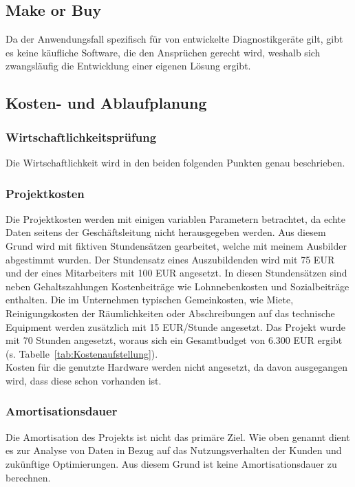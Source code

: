 \subsection{\glqq Make or Buy\grqq}
\label{sec:MakeOrBuy}
Da der Anwendungsfall spezifisch für von {\betriebNameKzf} entwickelte Diagnostikgeräte gilt, gibt es keine käufliche Software, die den Ansprüchen gerecht wird, weshalb sich zwangsläufig die Entwicklung einer eigenen Lösung ergibt.

\subsection{Kosten- und Ablaufplanung}
\label{sec:KostenAblaufPlanung}

\subsubsection{Wirtschaftlichkeitsprüfung}
\label{sec:Wirtschaftlichkeitspruefung}
Die Wirtschaftlichkeit wird in den beiden folgenden Punkten genau beschrieben.

\subsubsection{Projektkosten}
\label{sec:Projektkosten}
Die Projektkosten werden mit einigen variablen Parametern betrachtet, da echte Daten seitens der Geschäftsleitung nicht herausgegeben werden. Aus diesem Grund wird mit fiktiven Stundensätzen gearbeitet, welche mit meinem Ausbilder abgestimmt wurden. Der Stundensatz eines Auszubildenden wird mit 75 EUR und der eines Mitarbeiters mit 100 EUR angesetzt. In diesen Stundensätzen sind neben Gehaltszahlungen Kostenbeiträge  wie Lohnnebenkosten und Sozialbeiträge enthalten. Die im Unternehmen typischen Gemeinkosten, wie Miete, Reinigungskosten der Räumlichkeiten oder Abschreibungen auf das technische Equipment werden zusätzlich mit 15 EUR/Stunde angesetzt. Das Projekt wurde mit 70 Stunden angesetzt, woraus sich ein Gesamtbudget von 6.300 EUR ergibt (s. Tabelle~\ref{tab:Kostenaufstellung}).
\\

Kosten für die genutzte Hardware werden nicht angesetzt, da davon ausgegangen wird, dass diese schon vorhanden ist.

\subsubsection{Amortisationsdauer}
\label{sec:Amortisationsdauer}
Die Amortisation des Projekts ist nicht das primäre Ziel. Wie oben genannt dient es zur Analyse von Daten in Bezug auf das Nutzungsverhalten der Kunden und zukünftige Optimierungen. Aus diesem Grund ist keine Amortisationsdauer zu berechnen.

